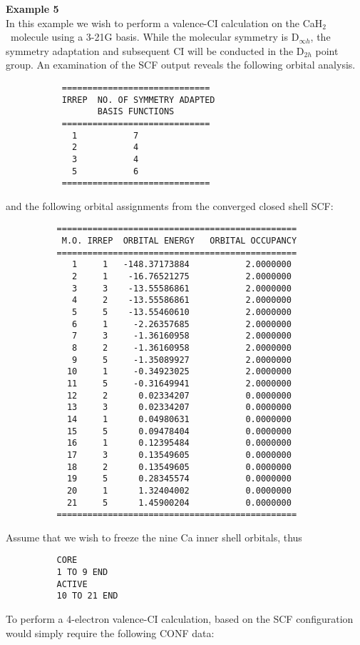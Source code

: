 \documentclass[11pt,fleqn]{article}
\newcommand{\cah}{\mbox{CaH$_{2}$}}
\begin{document}
{\bf Example 5}\\

In this example we wish to perform a valence-CI calculation 
on the \cah\
molecule using a 3-21G  basis. While the molecular symmetry
is D$_{\infty h}$, the symmetry adaptation  and subsequent CI 
will be conducted in the
D$_{2h}$ point group. An examination of the SCF output
reveals the following orbital analysis.

{
\footnotesize
\begin{verbatim}
           =============================
           IRREP  NO. OF SYMMETRY ADAPTED
                  BASIS FUNCTIONS
           =============================
             1           7
             2           4
             3           4
             5           6
           =============================
\end{verbatim}
}
and the following orbital assignments from
the converged closed shell SCF:
{
\footnotesize
\begin{verbatim}
          ===============================================
           M.O. IRREP  ORBITAL ENERGY   ORBITAL OCCUPANCY
          ===============================================
             1     1   -148.37173884           2.0000000
             2     1    -16.76521275           2.0000000
             3     3    -13.55586861           2.0000000
             4     2    -13.55586861           2.0000000
             5     5    -13.55460610           2.0000000
             6     1     -2.26357685           2.0000000
             7     3     -1.36160958           2.0000000
             8     2     -1.36160958           2.0000000
             9     5     -1.35089927           2.0000000
            10     1     -0.34923025           2.0000000
            11     5     -0.31649941           2.0000000
            12     2      0.02334207           0.0000000
            13     3      0.02334207           0.0000000
            14     1      0.04980631           0.0000000
            15     5      0.09478404           0.0000000
            16     1      0.12395484           0.0000000
            17     3      0.13549605           0.0000000
            18     2      0.13549605           0.0000000
            19     5      0.28345574           0.0000000
            20     1      1.32404002           0.0000000
            21     5      1.45900204           0.0000000
          ===============================================
\end{verbatim}
}
Assume that we wish to freeze the nine Ca inner shell orbitals, thus
{
\footnotesize
\begin{verbatim}
          CORE
          1 TO 9 END
          ACTIVE
          10 TO 21 END
\end{verbatim}
}
To perform a 4-electron valence-CI calculation,
based on the SCF configuration would simply require 
the following CONF data:
\end{document}
